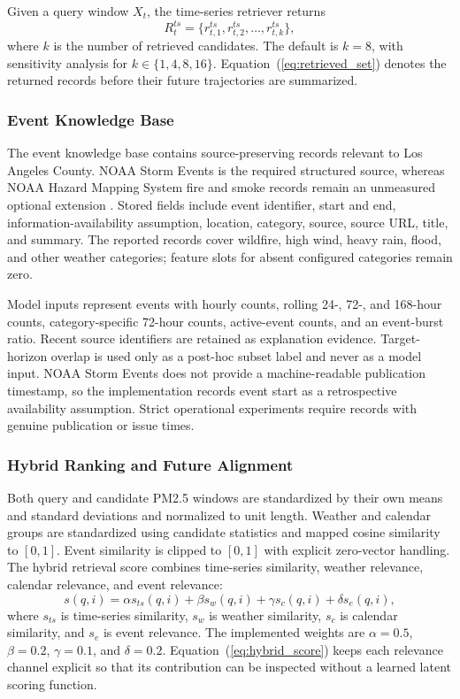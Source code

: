 Given a query window $X_t$, the time-series retriever returns
\begin{equation}
    R^{ts}_t = \{r^{ts}_{t,1}, r^{ts}_{t,2}, \ldots, r^{ts}_{t,k}\},
    \label{eq:retrieved_set}
\end{equation}
where $k$ is the number of retrieved candidates. The default is $k=8$, with
sensitivity analysis for $k\in\{1,4,8,16\}$.
Equation~(\ref{eq:retrieved_set}) denotes the returned records before their
future trajectories are summarized.

\subsubsection{Event Knowledge Base}
The event knowledge base contains source-preserving records relevant to Los
Angeles County. NOAA Storm Events is the required structured source, whereas
NOAA Hazard Mapping System fire and smoke records remain an unmeasured optional
extension \cite{noaastormevents2026,noaahms2026}. Stored fields include event
identifier, start and end, information-availability assumption, location,
category, source, source URL, title, and summary. The reported records cover
wildfire, high wind, heavy rain, flood, and other weather categories; feature
slots for absent configured categories remain zero.

Model inputs represent events with hourly counts, rolling 24-, 72-, and
168-hour counts, category-specific 72-hour counts, active-event counts, and an
event-burst ratio. Recent source identifiers are retained as explanation
evidence. Target-horizon overlap is used only as a post-hoc subset label and
never as a model input. NOAA Storm Events does not provide a machine-readable
publication timestamp, so the implementation records event start as a
retrospective availability assumption. Strict operational experiments require
records with genuine publication or issue times.

\subsubsection{Hybrid Ranking and Future Alignment}
Both query and candidate PM2.5 windows are standardized by their own means and
standard deviations and normalized to unit length. Weather and calendar groups
are standardized using candidate statistics and mapped cosine similarity to
$[0,1]$. Event similarity is clipped to $[0,1]$ with explicit zero-vector
handling. The hybrid retrieval score combines time-series similarity, weather
relevance, calendar relevance, and event relevance:
\begin{equation}
    s(q, i) =
    \alpha s_{ts}(q,i) +
    \beta s_{w}(q,i) +
    \gamma s_{c}(q,i) +
    \delta s_{e}(q,i),
    \label{eq:hybrid_score}
\end{equation}
where $s_{ts}$ is time-series similarity, $s_w$ is weather similarity, $s_c$ is
calendar similarity, and $s_e$ is event relevance. The implemented weights are
$\alpha=0.5$, $\beta=0.2$, $\gamma=0.1$, and $\delta=0.2$.
Equation~(\ref{eq:hybrid_score}) keeps each relevance channel explicit so that
its contribution can be inspected without a learned latent scoring function.

